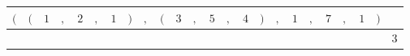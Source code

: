 {\scriptsize\setlength{\tabcolsep}{1.5pt}%
\begin{tabular}{ccccccccccccccccccccccc|l}
$($ & $($ & $\text{1}$ & $,$ & $\text{2}$ & $,$ & $\text{1}$ & $)$ & $,$ & $($ & $\text{3}$ & $,$ & $\text{5}$ & $,$ & $\text{4}$ & $)$ & $,$ & $\text{1}$ & $,$ & $\text{7}$ & $,$ & $\text{1}$ & $)$ & \\ \hline
\gcell{$$} & \gcell{$$} & \gcell{$\posD{\bullet}$} & \gcell{$\posC{\circ}$} & \gcell{$\posD{\bullet}$} & \gcell{$\posC{\circ}$} & \gcell{$\posD{\bullet}$} & \gcell{$$} & \gcell{$\posC{\circ}$} & \gcell{$$} & \gcell{$\posD{\bullet}$} & \gcell{$\posC{\circ}$} & \gcell{$\posD{\bullet}$} & \gcell{$\posC{\circ}$} & \gcell{$\posD{\bullet}$} & \gcell{$$} & \gcell{$\posC{\circ}$} & \gcell{$\posD{\bullet}$} & \gcell{$\posC{\circ}$} & \gcell{$$} & \gcell{$\posC{\circ}$} & \gcell{$\posD{\bullet}$} & \gcell{$$} & $\text{3}$ \\
\end{tabular}}
